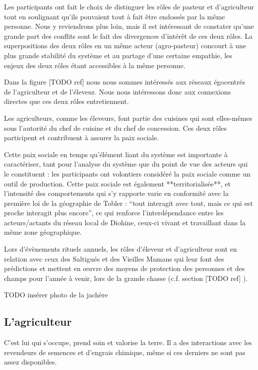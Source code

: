 Les participants ont fait le choix de distinguer les rôles de pasteur et d'agriculteur tout en soulignant qu'ils pouvaient tout à fait être endossés par la même personne. Nous y reviendrons plus loin, mais il est intéressant de constater qu'une grande part des conflits sont le fait des divergences d'intérêt de ces deux rôles. La superpositions des deux rôles en un même acteur (agro-pasteur) concourt à une plus grande stabilité du système et au partage d'une certaine empathie, les enjeux des deux rôles étant accessibles à la même personne.

Dans la figure [TODO ref] nous nous sommes intéressés aux réseaux égocentrés de l'agriculteur et de l'éleveur. Nous nous intéressons donc aux connexions directes que ces deux rôles entretiennent. 

Les agriculteurs, comme les éleveurs, font partie des cuisines qui sont elles-mêmes sous l'autorité du chef de cuisine et du chef de concession. Ces deux rôles participent et contribuent à assurer la paix sociale. 

Cette paix sociale en temps qu'élément liant du système est importante à caractériser, tant pour l'analyse du système que du point de vue des acteurs qui le constituent : les participants ont volontiers considéré la paix sociale comme un outil de production. Cette paix sociale est également **territorialisée**, et l'intensité des comportements qui s'y rapporte varie en conformité avec la première loi de la géographie de Tobler : “tout interagit avec tout, mais ce qui est proche interagit plus encore”, ce qui renforce l'interdépendance entre les acteurs/actants du réseau local de Diohine, ceux-ci vivant et travaillant dans la même zone géographique.

Lors d'évènements rituels annuels, les rôles d'éleveur et d'agriculteur sont en relation avec ceux des Saltigués et des Vieilles Mamans qui leur font des prédictions et mettent en œuvre des moyens de protection des personnes et des champs pour l'année à venir, lors de la grande chasse (c.f. section [TODO ref] ). 


TODO insérer photo de la jachère 

\subsection{L'agriculteur}
C'est lui qui s'occupe, prend soin et valorise la terre. Il a des interactions avec les revendeurs de semences et d'engrais chimique, même si ces derniers ne sont pas assez disponibles. 

